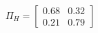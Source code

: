 \documentclass[border=3mm,preview]{standalone}\usepackage{amsmath}
\begin{document}
\[
\Pi_{H}= 
\left[\begin{array}{cc} 
0.68 & 0.32 \\ 
0.21 & 0.79 
\end{array}\right] \] 
\end{document}

